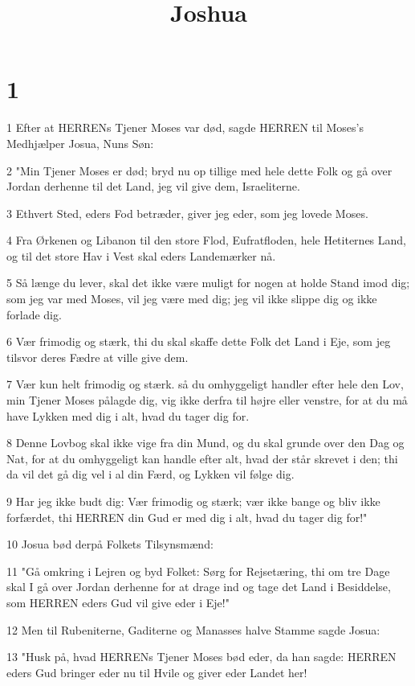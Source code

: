 

\title{Joshua}


\chapter{1}

\par 1 Efter at HERRENs Tjener Moses var død, sagde HERREN til Moses's Medhjælper Josua, Nuns Søn:
\par 2 "Min Tjener Moses er død; bryd nu op tillige med hele dette Folk og gå over Jordan derhenne til det Land, jeg vil give dem, Israeliterne.
\par 3 Ethvert Sted, eders Fod betræder, giver jeg eder, som jeg lovede Moses.
\par 4 Fra Ørkenen og Libanon til den store Flod, Eufratfloden, hele Hetiternes Land, og til det store Hav i Vest skal eders Landemærker nå.
\par 5 Så længe du lever, skal det ikke være muligt for nogen at holde Stand imod dig; som jeg var med Moses, vil jeg være med dig; jeg vil ikke slippe dig og ikke forlade dig.
\par 6 Vær frimodig og stærk, thi du skal skaffe dette Folk det Land i Eje, som jeg tilsvor deres Fædre at ville give dem.
\par 7 Vær kun helt frimodig og stærk. så du omhyggeligt handler efter hele den Lov, min Tjener Moses pålagde dig, vig ikke derfra til højre eller venstre, for at du må have Lykken med dig i alt, hvad du tager dig for.
\par 8 Denne Lovbog skal ikke vige fra din Mund, og du skal grunde over den Dag og Nat, for at du omhyggeligt kan handle efter alt, hvad der står skrevet i den; thi da vil det gå dig vel i al din Færd, og Lykken vil følge dig.
\par 9 Har jeg ikke budt dig: Vær frimodig og stærk; vær ikke bange og bliv ikke forfærdet, thi HERREN din Gud er med dig i alt, hvad du tager dig for!"
\par 10 Josua bød derpå Folkets Tilsynsmænd:
\par 11 "Gå omkring i Lejren og byd Folket: Sørg for Rejsetæring, thi om tre Dage skal I gå over Jordan derhenne for at drage ind og tage det Land i Besiddelse, som HERREN eders Gud vil give eder i Eje!"
\par 12 Men til Rubeniterne, Gaditerne og Manasses halve Stamme sagde Josua:
\par 13 "Husk på, hvad HERRENs Tjener Moses bød eder, da han sagde: HERREN eders Gud bringer eder nu til Hvile og giver eder Landet her!
